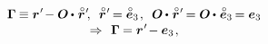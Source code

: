 \nopagebreak\vspace{-0.3em}\begin{multline}
\label{cosseratrod.firstdeformationvectorexplained}
%
\firstdeformationvectorcosseratline \hspace{-0.1ex} \equiv \currentlocationvector{\hspace{.1ex}'} \hspace{-0.3ex} - \rotationtensor \hspace{-0.1ex} \dotp \hspace{.15ex} \initiallocationvector{\hspace{.1ex}'} \hspace{-0.4ex}
,
\hspace{.5em}
\initiallocationvector{\hspace{.1ex}'} \hspace{-0.2ex} = \mathcircabove{\bm{e}}_{3}
\hspace{.2ex} ,
\hspace{.5em}
\rotationtensor \hspace{-0.1ex} \dotp \hspace{.15ex} \initiallocationvector{\hspace{.1ex}'} \hspace{-0.2ex}
= \rotationtensor \hspace{-0.1ex} \dotp \hspace{.15ex} \mathcircabove{\bm{e}}_{3} \hspace{-0.2ex}
= \bm{e}_{3}
%
\\[-0.25em]
\Rightarrow \hspace{.4em}
%
\firstdeformationvectorcosseratline \hspace{-0.1ex} = \currentlocationvector{\hspace{.1ex}'} \hspace{-0.3ex} - \bm{e}_{3}
\hspace{.2ex} ,
\end{multline}

